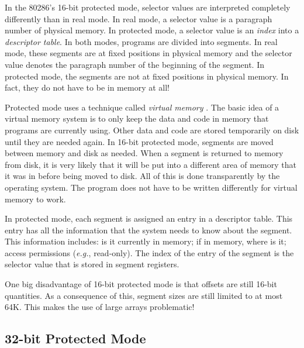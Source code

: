 In the 80286's 16-bit protected mode, selector values are interpreted
completely differently than in real mode. In real mode, a selector
value is a paragraph number of physical memory. In protected mode, a
selector value is an \emph{index} into a \emph{descriptor table}. In
both modes, programs are divided into
segments. In real mode, these segments are at
fixed positions in physical memory and the selector value denotes the
paragraph number of the beginning of the segment. In protected mode,
the segments are not at fixed positions in physical memory. In fact,
they do not have to be in memory at all!

Protected mode uses a technique called \emph{virtual memory}
. The basic idea of a virtual memory system is
to only keep the data and code in memory that programs are currently
using. Other data and code are stored temporarily on disk until they
are needed again.  In 16-bit protected mode, segments are moved
between memory and disk as needed. When a segment is returned to
memory from disk, it is very likely that it will be put into a
different area of memory that it was in before being moved to
disk. All of this is done transparently by the operating system. The
program does not have to be written differently for virtual memory to
work.

In protected mode, each segment is assigned an entry in a descriptor table.
This entry has all the information that the system needs to know about the
segment. This information includes: is it currently in memory; if in memory,
where is it; access permissions ({\em e.g.\/}, read-only). The index of the
entry of the segment is the selector value that is stored in segment registers.

One  big disadvantage of 16-bit protected mode is that offsets
are still 16-bit quantities. As a consequence of this, segment sizes
are still limited to at most 64K. This makes the use of large arrays
problematic!

\subsection{32-bit Protected Mode}

